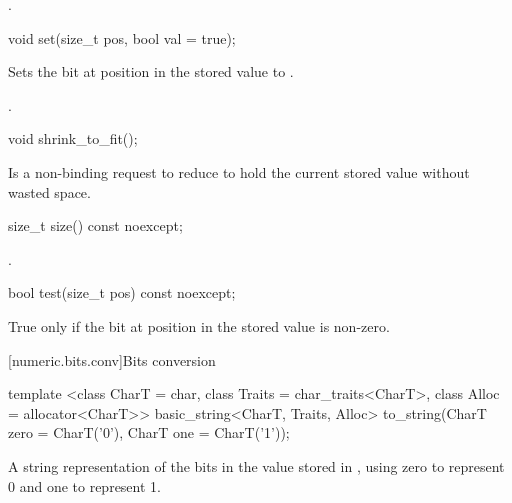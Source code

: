 \begin{addedblock}
\begin{itemdescr}
.
\end{itemdescr}

\begin{itemdecl}
void set(size_t pos, bool val = true);
\end{itemdecl}

\begin{itemdescr}
\effects Sets the bit at position  in the stored value to .

\returns {}.
\end{itemdescr}

\begin{itemdecl}
void shrink_to_fit();
\end{itemdecl}

\begin{itemdescr}
\effects Is a non-binding request to reduce  to hold the current stored value without wasted space.
\end{itemdescr}

\begin{itemdecl}
size_t size() const noexcept;
\end{itemdecl}

\begin{itemdescr}
\returns {}.
\end{itemdescr}

\begin{itemdecl}
bool test(size_t pos) const noexcept;
\end{itemdecl}

\begin{itemdescr}
\returns True only if the bit at position  in the stored value is non-zero.
\end{itemdescr}

[numeric.bits.conv]{Bits conversion}

\begin{itemdecl}
template <class CharT = char, class Traits = char_traits<CharT>, class Alloc = allocator<CharT>>
  basic_string<CharT, Traits, Alloc> to_string(CharT zero = CharT('0'),
                                               CharT one = CharT('1'));
\end{itemdecl}

\begin{itemdescr}
\returns A string representation of the bits in the value stored in , using zero to represent 0 and one to represent 1.
\end{itemdescr}


\end{addedblock}
